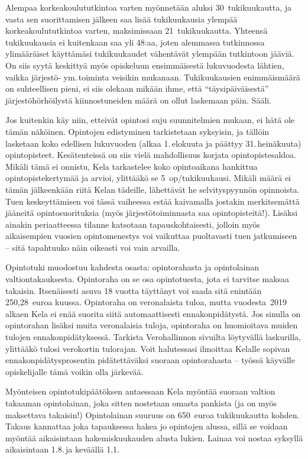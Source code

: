 \documentclass[a5paper, 8pt, twocolumn]{book} %
\numberwithin{equation}{section}
\begin{document}
Alempaa korkeakoulututkintoa
varten myönnetään aluksi
30~tukikuukautta, ja vasta sen suorittamisen
jälkeen saa lisää tukikuukausia ylempää
korkeakoulututkintoa varten, maksimissaan
21~tukikuukautta. Yhteensä tukikuukausia
ei kuitenkaan saa yli 48:aa, joten alemmassa
tutkinnossa ylimääräiset käyttämäsi
tukikuukaudet vähentävät ylempään tutkintoon
jääviä. On siis syytä keskittyä myös
opiskeluun ensimmäisestä lukuvuodesta
lähtien, vaikka järjestö- ym.\,toiminta veisikin
mukanaan. Tukikuukausien enimmäismäärä
on suhteellisen pieni, ei siis olekaan
mikään ihme, että ``täysipäiväisestä'' järjestöhörhöilystä
kiinnostuneiden määrä on
ollut laskemaan päin. Sääli.

Jos kuitenkin käy niin, etteivät opintosi
suju suunnitelmien mukaan, ei hätä ole
tämän näköinen. Opintojen edistyminen
tarkistetaan syksyisin, ja tällöin lasketaan
koko edellisen lukuvuoden (alkaa 1.\,elokuuta
ja päättyy 31.\,heinäkuuta) opintopisteet.
Kesätenteissä on siis vielä mahdollisuus
korjata opintopistesaldoa. Mikäli tämä ei onnistu, Kela tarkastelee koko opintoaikana hankittua opintopistekertymää ja arvioi, ylittääkö se 5~op/tukikuukausi. Mikäli
määrä ei tämän jälkeenkään riitä Kelan tädeille,
lähettävät he selvityspyynnön opinnoista.
Tuen keskeyttämisen voi tässä
vaiheessa estää kaivamalla jostakin merkitsemättä
jääneitä opintosuorituksia (myös
järjestötoiminnasta saa opintopisteitä!).
Lisäksi ainakin periaatteessa tilanne katsotaan
tapauskohtaisesti, jolloin myös aikaisempien
vuosien opintomenestys voi vaikuttaa
puoltavasti tuen jatkumiseen -- sitä
tapahtuuko näin oikeasti voi vain arvailla.

Opintotuki muodostuu kahdesta osasta: opintorahasta ja opintolainan valtiontakauksesta. Opintoraha on se osa opintotuesta, jota ei tarvitse maksaa takaisin. Itsenäisesti asuva 18 vuotta täyttänyt voi saada sitä enintään 250,28~euroa kuussa. Opintoraha on veronalaista tuloa, mutta vuodesta~2019 alkaen Kela ei enää suorita siitä automaattisesti ennakonpidätystä. Jos sinulla on opintorahan lisäksi muita veronalaisia tuloja, opintoraha on huomioitava muiden tulojen ennakonpidätyksessä. Tarkista Verohallinnon sivuilta löytyvällä laskurilla, ylittääkö tulosi verokortin tulorajan. Voit halutessasi ilmoittaa Kelalle sopivan ennakonpidätysprosentin pidätettäväksi suoraan opintorahasta -- työssä käyvälle opiskelijalle tämä voikin olla järkevää.

Myönteisen opintotukipäätöksen antaessaan
Kela myöntää suoraan valtion takaaman opintolainan, joka
sitten nostetaan omasta pankista (ja on
myös maksettava takaisin!) Opintolainan
suuruus on 650~euroa tukikuukautta kohden.
Takaus kannattaa joka tapauksessa
hakea jo opintojen alussa, sillä se voidaan
myöntää aikaisintaan hakemiskuukauden
alusta lukien. Lainaa voi nostaa syksyllä aikaisintaan
1.8.\,ja keväällä 1.1. 
\end{document}
